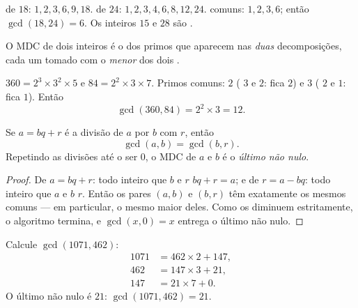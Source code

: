 \begin{example}
 de $18$: $1, 2, 3, 6, 9, 18$.  de $24$: $1, 2, 3, 4,
6, 8, 12, 24$.  comuns: $1, 2, 3, 6$; então
$\gcd(18, 24) = 6$. Os inteiros $15$ e $28$ são .
\end{example}

\begin{proposition}\label{prop:g9:arith:gcdfact}
O MDC de dois inteiros é o  dos primos que aparecem nas
\emph{duas} decomposições, cada um tomado com o \emph{menor} dos dois
.
\end{proposition}
\admitted

\begin{example}\label{ex:g9:arith:gcdfact}
$360 = 2^3 \times 3^2 \times 5$ e $84 = 2^2 \times 3 \times 7$. Primos
comuns: $2$ ( $3$ e $2$: fica $2$) e $3$ ( $2$ e $1$:
fica $1$). Então
\[
\gcd(360, 84) = 2^2 \times 3 = 12 .
\]
\end{example}

\begin{theorem}\label{thm:g9:arith:euclidalgo}
Se $a = bq + r$ é a divisão de $a$ por $b$ com  $r$, então
\[
\gcd(a, b) = \gcd(b, r).
\]
Repetindo as divisões até o  ser $0$, o MDC de $a$ e $b$ é o
\emph{último  não nulo}.
\end{theorem}

\begin{proof}
De $a = bq + r$: todo inteiro que  $b$ e $r$ 
$bq + r = a$; e de $r = a - bq$: todo inteiro que  $a$ e $b$
 $r$. Então os pares $(a, b)$ e $(b, r)$ têm exatamente os mesmos
 comuns --- em particular, o mesmo maior deles. Como os 
diminuem estritamente, o algoritmo termina, e $\gcd(x, 0) = x$ entrega
o último  não nulo.
\end{proof}

\begin{example}\label{ex:g9:arith:euclidalgo}
Calcule $\gcd(1071, 462)$:
\begin{align*}
1071 &= 462 \times 2 + 147, \\
462 &= 147 \times 3 + 21, \\
147 &= 21 \times 7 + 0 .
\end{align*}
O último  não nulo é $21$: $\gcd(1071, 462) = 21$.
\end{example}

